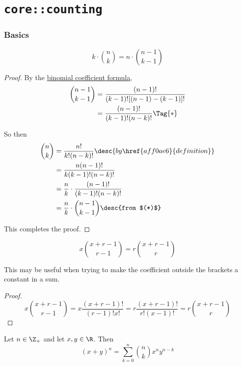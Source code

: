 \chapter{\texttt{core::counting}}\label{ec1e13a}

\subsection{Basics}\label{e84f7ed}

\label{e676e33}

$$
  k\cdot\binom nk = n\cdot\binom{n-1}{k-1}
$$

\begin{proof}
  By the \href{aff0ae6}{binomial coefficient formula},
  \begin{align*}
    \binom{n-1}{k-1} &=\frac{(n-1)!}{(k-1)![(n-1)-(k-1)]!} \\
                     &=\frac{(n-1)!}{(k-1)!(n-k)!}\Tag{*}
  \end{align*}

  So then
  \begin{align*}
    \binom nk &=\frac{n!}{k!(n-k)!}\desc{by \href{aff0ae6}{definition}} \\
              &=\frac{n(n-1)!}{k(k-1)!(n-k)!}                           \\
              &=\frac nk\cdot\frac{(n-1)!}{(k-1)!(n-k)!}                \\
              &=\frac nk\cdot\binom{n-1}{k-1}\desc{from $(*)$}
  \end{align*}

  This completes the proof.
\end{proof}

\Lemma{}\label{e39bc84}

$$
  x\binom{x+r-1}{r-1}=r\binom{x+r-1}r
$$

This may be useful when trying to make the coefficient outside the brackets a
constant in a sum.

\begin{proof}
  \begin{equation*}
    x\binom{x+r-1}{r-1}
    =x\frac{(x+r-1)!}{(r-1)!x!}
    =r\frac{(x+r-1)!}{r!(x-1)!}
    =r\binom{x+r-1}r
  \end{equation*}
\end{proof}

\label{d972e65}

Let $n\in\Z_+$ and let $x,y\in\R$. Then
$$
  (x+y)^n=\sum_{k=0}^n\binom nkx^ny^{n-k}
$$
